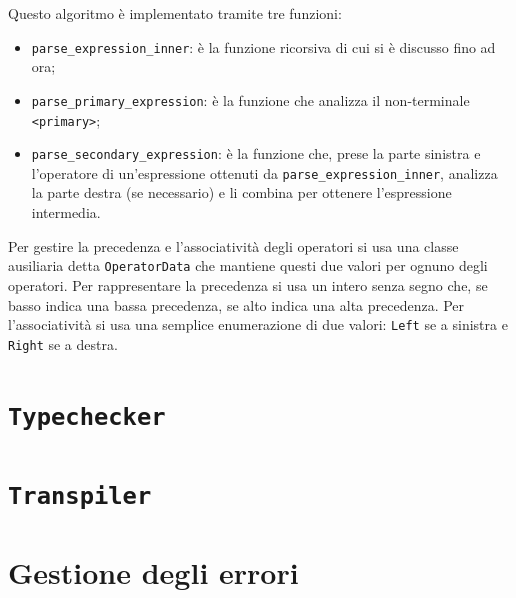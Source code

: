 Questo algoritmo \`e implementato tramite tre funzioni:
\begin{itemize}
	\item \texttt{parse\_expression\_inner}: \`e la funzione ricorsiva di cui si \`e discusso fino ad ora;
	\item \texttt{parse\_primary\_expression}: \`e la funzione che analizza il non-terminale \texttt{<primary>};
	\item \texttt{parse\_secondary\_expression}: \`e la funzione che, prese la parte sinistra e l'operatore di un'espressione ottenuti da \linebreak \texttt{parse\_expression\_inner}, analizza la parte destra (se necessario) e li combina per ottenere l'espressione intermedia.
\end{itemize}
Per gestire la precedenza e l'associativit\`a degli operatori si usa una classe ausiliaria detta \texttt{OperatorData} che mantiene questi due valori per ognuno degli operatori. Per rappresentare la precedenza si usa un intero senza segno che, se basso indica una bassa precedenza, se alto indica una alta precedenza. Per l'associativit\`a si usa una semplice enumerazione di due valori: \texttt{Left} se a sinistra e \texttt{Right} se a destra.

\section{\texttt{Typechecker}}
\label{sec:typechecker}

\section{\texttt{Transpiler}}
\label{sec:transpiler}

\section{Gestione degli errori}
\label{sec:gestione-degli-errori}
